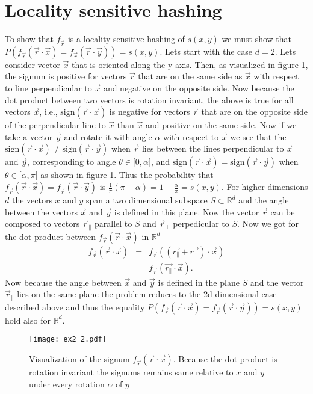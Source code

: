 \documentclass[article,11pt]{article}
\begin{document}
\section{Locality sensitive hashing}
To show that $f_{\vec{r}}$ is a locality sensitive hashing of $s(x,y)$ we must show that
$P(f_{\vec{r}}(\vec{r}\cdot\vec{x}) = f_{\vec{r}}(\vec{r}\cdot\vec{y})) = s(x,y)$. Lets start with the case $d=2$.
Lets consider vector $\vec{x}$ that is oriented along the y-axis. Then, as visualized in figure \ref{fig:ex2_2}, the signum is positive
for vectors $\vec{r}$ that are on the same side as $\vec{x}$ with respect to line perpendicular to $\vec{x}$ and negative on the opposite
side. Now because the dot product between two
vectors is rotation invariant, the above is true for all vectors $\vec{x}$, i.e., $\mathrm{sign}(\vec{r}\cdot\vec{x})$ is negative for
vectors $\vec{r}$ that are on the opposite side of the perpendicular line to $\vec{x}$ than $\vec{x}$ and positive on the same side. Now if
we take a vector $\vec{y}$ and rotate it with
angle $\alpha$ with respect to $\vec{x}$ we see that the $\mathrm{sign}(\vec{r}\cdot\vec{x}) \neq \mathrm{sign}(\vec{r}\cdot\vec{y})$ when
$\vec{r}$ lies between the lines perpendicular to $\vec{x}$ and $\vec{y}$, corresponding to angle $\theta\in \lbrack 0, \alpha\rbrack$, and
$\mathrm{sign}(\vec{r}\cdot\vec{x}) = \mathrm{sign}(\vec{r}\cdot\vec{y})$ when   $\theta\in \lbrack \alpha, \pi\rbrack$ as shown in figure
\ref{fig:ex2_2}. Thus the probability that $f_{\vec{r}}(\vec{r}\cdot\vec{x}) = f_{\vec{r}}(\vec{r}\cdot\vec{y})$ is $\frac{1}{\pi}(\pi-\alpha)=1-\frac{\alpha}{\pi}=s(x,y)$. For higher dimensions $d$ the vectors $x$ and $y$ span a two dimensional subspace $S \subset \mathbb{R}^d$ and
the angle between the  vectors $\vec{x}$ and $\vec{y}$ is defined in this plane.
Now the vector $\vec{r}$ can be composed to vectors $\vec{r}_\parallel$ parallel to $S$ and $\vec{r}_\bot$ perpedicular to $S$. Now we got for
the dot product between $f_{\vec{r}}(\vec{r}\cdot\vec{x})$ in $\mathbb{R}^d$
\begin{eqnarray}
  f_{\vec{r}}(\vec{r}\cdot\vec{x}) &=& f_{\vec{r}}((\vec{r_\parallel} + \vec{r_\bot})\cdot\vec{x})\nonumber\\
  &=& f_{\vec{r}}(\vec{r_\parallel}\cdot\vec{x}).
  \label{eq:hyperplane}
\end{eqnarray}
Now because the angle between $\vec{x}$ and $\vec{y}$ is defined in the plane $S$  and the vector $\vec{r}_\parallel$ lies on the same plane
the problem reduces to the 2d-dimensional case described above and thus the equality $P(f_{\vec{r}}(\vec{r}\cdot\vec{x}) = f_{\vec{r}}(\vec{r}\cdot\vec{y})) = s(x,y)$ hold also for $\mathbb{R}^d$.
\begin{figure}[!h]
  \centering
  \texttt{[image: ex2\_2.pdf]}
  \caption{Visualization of the signum $f_{\vec{r}}(\vec{r}\cdot\vec{x})$. Because the dot product is rotation invariant
  the signums remains same relative to $x$ and $y$ under every rotation $\alpha$ of $y$}
  \label{fig:ex2_2}
\end{figure}
\end{document}
